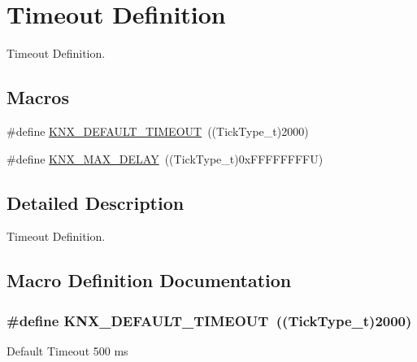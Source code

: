 \hypertarget{group___k_n_x___timeout}{}\section{Timeout Definition}
\label{group___k_n_x___timeout}


Timeout Definition.  


\subsection*{Macros}
\begin{DoxyCompactItemize}
\item 
\#define \hyperlink{group___k_n_x___timeout_ga2403c0399f3728bfe63f5d9cf631817d}{K\+N\+X\+\_\+\+D\+E\+F\+A\+U\+L\+T\+\_\+\+T\+I\+M\+E\+O\+UT}~((Tick\+Type\+\_\+t)2000)
\item 
\#define \hyperlink{group___k_n_x___timeout_ga8e1f26f2f54559b80991272e3b5e13e8}{K\+N\+X\+\_\+\+M\+A\+X\+\_\+\+D\+E\+L\+AY}~((Tick\+Type\+\_\+t)0x\+F\+F\+F\+F\+F\+F\+F\+F\+U)
\end{DoxyCompactItemize}


\subsection{Detailed Description}
Timeout Definition. 



\subsection{Macro Definition Documentation}
\subsubsection[{\texorpdfstring{K\+N\+X\+\_\+\+D\+E\+F\+A\+U\+L\+T\+\_\+\+T\+I\+M\+E\+O\+UT}{KNX_DEFAULT_TIMEOUT}}]{\setlength{\rightskip}{0pt plus 5cm}\#define K\+N\+X\+\_\+\+D\+E\+F\+A\+U\+L\+T\+\_\+\+T\+I\+M\+E\+O\+UT~((Tick\+Type\+\_\+t)2000)}\hypertarget{group___k_n_x___timeout_ga2403c0399f3728bfe63f5d9cf631817d}{}\label{group___k_n_x___timeout_ga2403c0399f3728bfe63f5d9cf631817d}
Default Timeout 500 ms 
